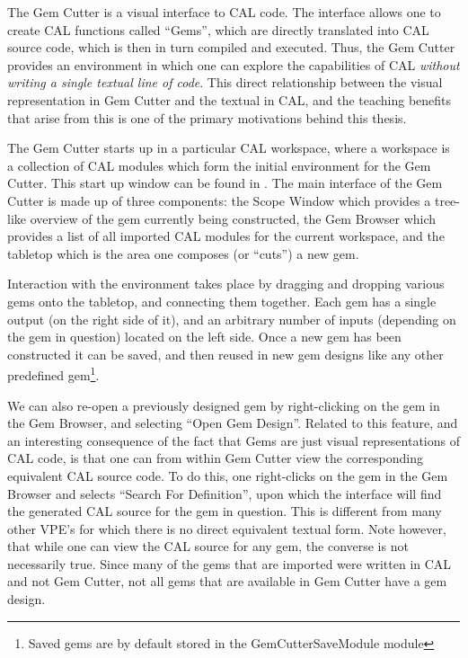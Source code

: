 The Gem Cutter is a visual interface to CAL code.  The interface allows one to create CAL functions called ``Gems'', which are directly translated into CAL source code, which is then in turn compiled and executed.  Thus, the Gem Cutter provides an environment in which one can explore the capabilities of CAL \emph{without writing a single textual line of code}.  This direct relationship between the visual representation in Gem Cutter and the textual in CAL, and the teaching benefits that arise from this is one of the primary motivations behind this thesis.

The Gem Cutter starts up in a particular CAL workspace, where a workspace is a collection of CAL modules which form the initial environment for the Gem Cutter.  This start up window can be found in .  The main interface of the Gem Cutter is made up of three components: the Scope Window which provides a tree-like overview of the gem currently being constructed, the Gem Browser which provides a list of all imported CAL modules for the current workspace, and the tabletop which is the area one composes (or ``cuts'') a new gem.


Interaction with the environment takes place by dragging and dropping various gems onto the tabletop, and connecting them together.  Each gem has a single output (on the right side of it), and an arbitrary number of inputs (depending on the gem in question) located on the left side.  Once a new gem has been constructed it can be saved, and then reused in new gem designs like any other predefined gem\footnote{Saved gems are by default stored in the GemCutterSaveModule module}.

We can also re-open a previously designed gem by right-clicking on the gem in the Gem Browser, and selecting ``Open Gem Design''.  Related to this feature, and an interesting consequence of the fact that Gems are just visual representations of CAL code, is that one can from within Gem Cutter view the corresponding equivalent CAL source code.  To do this, one right-clicks on the gem in the Gem Browser and selects ``Search For Definition'', upon which the interface will find the generated CAL source for the gem in question.  This is different from many other VPE's for which there is no direct equivalent textual form.  Note however, that while one can view the CAL source for any gem, the converse is not necessarily true.  Since many of the gems that are imported were written in CAL and not Gem Cutter, not all gems that are available in Gem Cutter have a gem design.

